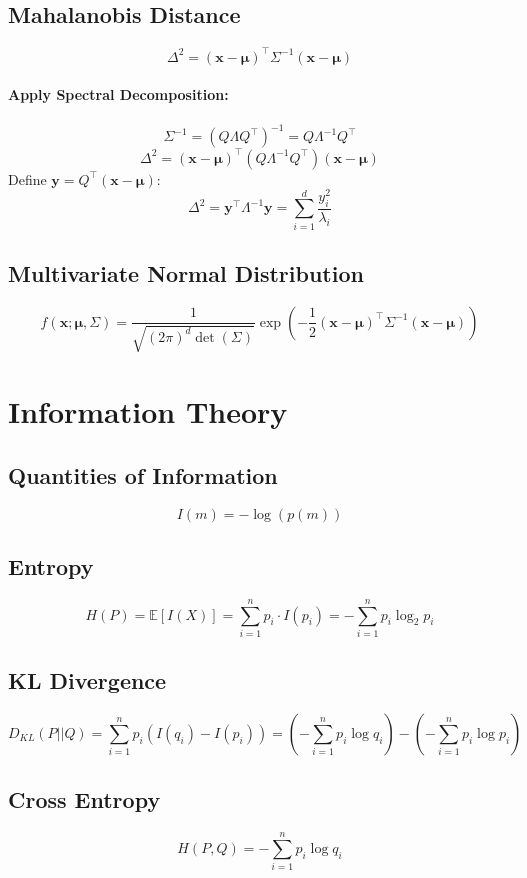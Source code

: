 \documentclass{article}
\begin{document}
\subsection{Mahalanobis Distance}
\[
    \Delta^2 = (\mathbf{x} - \boldsymbol{\mu})^\top \Sigma^{-1} (\mathbf{x} - \boldsymbol{\mu})
\]

\paragraph{Apply Spectral Decomposition:}
\[
    \Sigma^{-1} = (Q \Lambda Q^\top)^{-1} = Q \Lambda^{-1} Q^\top
\]
\[
    \Delta^2 = (\mathbf{x} - \boldsymbol{\mu})^\top (Q \Lambda^{-1} Q^\top) (\mathbf{x} - \boldsymbol{\mu})
\]
Define \( \mathbf{y} = Q^\top (\mathbf{x} - \boldsymbol{\mu}) \):
\[
    \Delta^2 = \mathbf{y}^\top \Lambda^{-1} \mathbf{y} = \sum_{i=1}^{d} \frac{y_i^2}{\lambda_i}
\]

\subsection{Multivariate Normal Distribution}
\[
    f(\mathbf{x}; \boldsymbol{\mu}, \Sigma) = \frac{1}{\sqrt{(2\pi)^d\det(\Sigma)}} \exp\left(-\frac{1}{2}(\mathbf{x} - \boldsymbol{\mu})^\top \Sigma^{-1} (\mathbf{x} - \boldsymbol{\mu})\right)
\]


\newpage
\section{Information Theory}

\subsection{Quantities of Information}
\[
    I(m) = -\log(p(m))
\]

\subsection{Entropy}
\[
    H(P) = \mathbb{E}[I(X)] = \sum_{i=1}^{n} p_i \cdot I(p_i) = -\sum_{i=1}^{n} p_i \log_2 p_i
\]

\subsection{KL Divergence}
\[
    D_{KL}(P||Q) = \sum_{i=1}^{n} p_i (I(q_i) - I(p_i)) = (-\sum_{i=1}^{n} p_i \log q_i) - (-\sum_{i=1}^{n} p_i \log p_i)
\]

\subsection{Cross Entropy}
\[
    H(P, Q) = -\sum_{i=1}^{n} p_i \log q_i
\]
\end{document}
